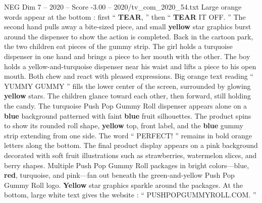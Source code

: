 \begin{textsample}{NEG Dim 7 – 2020 – Score -3.00 – 2020/tv\_com\_2020\_54.txt}
Large orange words appear at the bottom : first “ \textbf{TEAR}, ” then “ \textbf{TEAR} IT OFF. ” The second hand pulls away a bite-sized piece, and small \textbf{yellow} star graphics burst around the dispenser to show the action is completed.
Back in the cartoon park, the two children eat pieces of the gummy strip.
The girl holds a turquoise dispenser in one hand and brings a piece to her mouth with the other.
The boy holds a yellow-and-turquoise dispenser near his waist and lifts a piece to his open mouth.
Both chew and react with pleased expressions.
Big orange text reading “ YUMMY GUMMY ” fills the lower center of the screen, surrounded by glowing \textbf{yellow} stars.
The children glance toward each other, then forward, still holding the candy.
The turquoise Push Pop Gummy Roll dispenser appears alone on a \textbf{blue} background patterned with faint \textbf{blue} fruit silhouettes.
The product spins to show its rounded roll shape, \textbf{yellow} top, front label, and the \textbf{blue} gummy strip extending from one side.
The word “ PERFECT! ” remains in bold orange letters along the bottom.
The final product display appears on a pink background decorated with soft fruit illustrations such as strawberries, watermelon slices, and berry shapes.
Multiple Push Pop Gummy Roll packages in bright colors—blue, \textbf{red}, turquoise, and pink—fan out beneath the green-and-yellow Push Pop Gummy Roll logo. \textbf{Yellow} star graphics sparkle around the packages.
At the bottom, large white text gives the website : “ PUSHPOPGUMMYROLL.COM. ”

\end{textsample}
